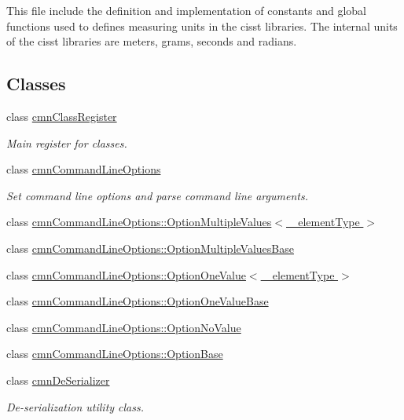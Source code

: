 \begin{DoxyCompactItemize}
\begin{DoxyCompactList}
This file include the definition and implementation of constants and global functions used to defines measuring units in the cisst libraries. The internal units of the cisst libraries are meters, grams, seconds and radians. \end{DoxyCompactList}\end{DoxyCompactItemize}
\subsection*{Classes}
\begin{DoxyCompactItemize}
\item 
class \hyperlink{classcmn_class_register}{cmn\+Class\+Register}
\begin{DoxyCompactList}\small\item\em Main register for classes. \end{DoxyCompactList}\item 
class \hyperlink{classcmn_command_line_options}{cmn\+Command\+Line\+Options}
\begin{DoxyCompactList}\small\item\em Set command line options and parse command line arguments. \end{DoxyCompactList}\item 
class \hyperlink{classcmn_command_line_options_1_1_option_multiple_values}{cmn\+Command\+Line\+Options\+::\+Option\+Multiple\+Values$<$ \+\_\+element\+Type $>$}
\item 
class \hyperlink{classcmn_command_line_options_1_1_option_multiple_values_base}{cmn\+Command\+Line\+Options\+::\+Option\+Multiple\+Values\+Base}
\item 
class \hyperlink{classcmn_command_line_options_1_1_option_one_value}{cmn\+Command\+Line\+Options\+::\+Option\+One\+Value$<$ \+\_\+element\+Type $>$}
\item 
class \hyperlink{classcmn_command_line_options_1_1_option_one_value_base}{cmn\+Command\+Line\+Options\+::\+Option\+One\+Value\+Base}
\item 
class \hyperlink{classcmn_command_line_options_1_1_option_no_value}{cmn\+Command\+Line\+Options\+::\+Option\+No\+Value}
\item 
class \hyperlink{classcmn_command_line_options_1_1_option_base}{cmn\+Command\+Line\+Options\+::\+Option\+Base}
\item 
class \hyperlink{classcmn_de_serializer}{cmn\+De\+Serializer}
\begin{DoxyCompactList}\small\item\em De-\/serialization utility class.


\end{DoxyCompactList}
\end{DoxyCompactItemize}
